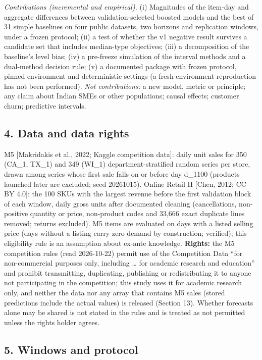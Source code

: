 \documentclass[
]{article}
\begin{document}
\emph{Contributions (incremental and empirical).} (i) Magnitudes of the
item-day and aggregate differences between validation-selected boosted
models and the best of 31 simple baselines on four public datasets, two
horizons and replication windows, under a frozen protocol; (ii) a test
of whether the v1 negative result survives a candidate set that includes
median-type objectives; (iii) a decomposition of the baseline's level
bias; (iv) a pre-freeze simulation of the interval methods and a
dual-method decision rule; (v) a documented package with frozen
protocol, pinned environment and deterministic settings (a
fresh-environment reproduction has not been performed). \emph{Not
contributions:} a new model, metric or principle; any claim about Indian
SMEs or other populations; causal effects; customer churn; predictive
intervals.

\subsection{4. Data and data rights}\label{data-and-data-rights}

M5 {[}Makridakis et al., 2022; Kaggle competition data{]}: daily unit
sales for 350 (CA\_1, TX\_1) and 349 (WI\_1) department-stratified
random series per store, drawn among series whose first sale falls on or
before day d\_1100 (products launched later are excluded; seed
20261015). Online Retail II {[}Chen, 2012; CC BY 4.0{]}: the 100 SKUs
with the largest revenue before the first validation block of each
window, daily gross units after documented cleaning (cancellations,
non-positive quantity or price, non-product codes and 33,666 exact
duplicate lines removed; returns excluded). M5 items are evaluated on
days with a listed selling price (days without a listing carry zero
demand by construction; verified); this eligibility rule is an
assumption about ex-ante knowledge. \textbf{Rights:} the M5 competition
rules (read 2026-10-22) permit use of the Competition Data ``for
non-commercial purposes only, including \ldots{} for academic research
and education'' and prohibit transmitting, duplicating, publishing or
redistributing it to anyone not participating in the competition; this
study uses it for academic research only, and neither the data nor any
array that contains M5 sales (stored predictions include the actual
values) is released (Section 13). Whether forecasts alone may be shared
is not stated in the rules and is treated as not permitted unless the
rights holder agrees.

\subsection{5. Windows and protocol}\label{windows-and-protocol}
\end{document}
